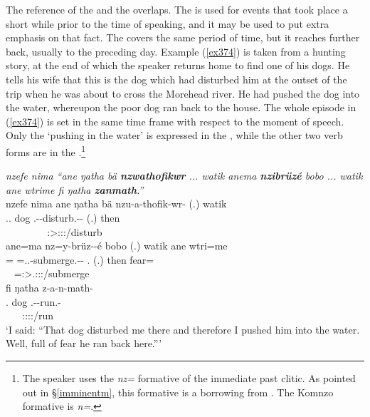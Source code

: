 The  reference of the  and the  overlaps. The  is used for events that took place a short while prior to the time of speaking, and it may be used to put extra emphasis on that fact. The  covers the same period of time, but it reaches further back, usually to the preceding day. Example (\ref{ex374}) is taken from a hunting story, at the end of which the speaker returns home to find one of his dogs. He tells his wife that this is the dog which had disturbed him at the outset of the trip when he was about to cross the Morehead river. He had pushed the dog into the water, whereupon the poor dog ran back to the house. The whole episode in (\ref{ex374}) is set in the same time frame with respect to the moment of speech. Only the `pushing in the water' is expressed in the , while the other two verb forms are in the .\footnote{The speaker uses the \emph{nz=} formative of the immediate past clitic. As pointed out in {\S}\ref{imminentm}, this formative is a borrowing from . The Komnzo formative is \emph{n=}.}

\begin{exe}
	\ex \emph{nzefe nima ``ane ŋatha bä \textbf{nzwathofikwr} ... watik anema \textbf{nzibrüzé} bobo ... watik ane wtrime fi ŋatha \textbf{zanmath}.''}\\
	\glll nzefe nima ane ŋatha bä nzu-a-thofik-wr-\Zero{} (.) watik\\
	\Fsg.\Erg.{\Emph} {\Quot} {\Dem} dog \Med{} \Fsg.\Betaone-\Vc-disturb.\Ext-\Ndu-\Stsg{} (.) then\\ 
	~ ~ ~ ~ ~ {\footnotesize \Stsg:\Sbj>\Fsg:\Obj:\Rpst:\Ipfv/disturb} ~ ~\\
	\sn
	\glll ane=ma nz=y-brüz-\Zero{}-é bobo (.) watik ane wtri=me\\
	\Dem={\Char} \Immpst=\Tsg.\Masc.\Alph-submerge.\Ext-\Ndu-\Fsg{} \Med.{\All} (.) then {\Dem} fear={\Ins}\\
	~ {\footnotesize \Immpst=\Fsg:\Sbj>\Stsg.\Masc:\Obj:\Nonpast:\Ipfv/submerge} ~ ~ ~ ~ ~\\
	\sn
	\glll fi ŋatha z-a-n-math-\Zero\\
	\Third.{\Abs} dog \M.\Gam-\Venit-run.{\Rs}-\Stsg\\
	~ ~ {\footnotesize \Stsg:\Sbj:\Rpst:\Pfv:\Venit/run}\\
	\trans `I said: ``That dog disturbed me there and therefore I pushed him into the water. Well, full of fear he ran back here.''' 
	\label{ex374}
\end{exe}


